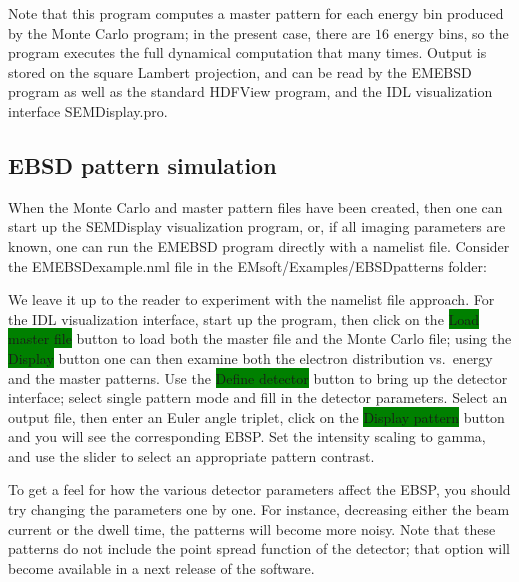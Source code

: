 \documentclass[DIV=calc, paper=letter, fontsize=11pt]{scrartcl}	 %
\newcommand{\button}[1]{\colorbox{green}{\textsf{#1}} button}
\begin{document}
Note that this program computes a master pattern for each energy bin produced by the Monte Carlo program; in the
present case, there are $16$ energy bins, so the program executes the full dynamical computation that many times.
Output is stored on the square Lambert projection, and can be read by the \textsf{EMEBSD} program as well as
the standard HDFView program, and the IDL visualization interface \textsf{SEMDisplay.pro}. 


\subsection{EBSD pattern simulation}
When the Monte Carlo and master pattern files have been created, then one can start up the 
\textsf{SEMDisplay} visualization program, or, if all imaging parameters are known, one can
run the \textsf{EMEBSD} program directly with a namelist file.  Consider 
the EMEBSDexample.nml file in the EMsoft/Examples/EBSDpatterns folder:

We leave it up to the reader to experiment with the namelist file approach.  For the IDL visualization interface, 
start up the program, then click on the \button{Load master file} to load both the master file and the Monte Carlo
file; using the \button{Display} one can then examine both the electron distribution vs.\ energy and the master
patterns.  Use the \button{Define detector} to bring up the detector interface; select \textsf{single pattern} mode
and fill in the detector parameters.  Select an output file, then enter an Euler angle triplet, click on the
\button{Display pattern} and you will see the corresponding EBSP.  Set the intensity scaling to gamma, and 
use the slider to select an appropriate pattern contrast.

To get a feel for how the various detector parameters affect the EBSP, you should try changing the parameters 
one by one.  For instance, decreasing either the beam current or the dwell time, the patterns will become more
noisy.  Note that these patterns do not include the point spread function of the detector; that option will become 
available in a next release of the software.
\end{document}
